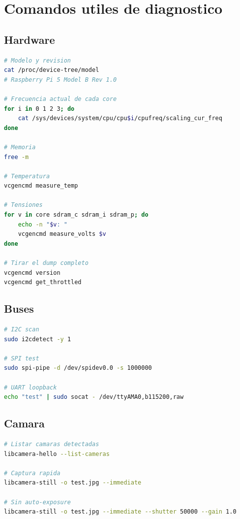 \documentclass[11pt,a4paper,oneside]{report}
\begin{document}
\chapter{Comandos utiles de diagnostico}

\section{Hardware}

\begin{lstlisting}[language=bash]
# Modelo y revision
cat /proc/device-tree/model
# Raspberry Pi 5 Model B Rev 1.0

# Frecuencia actual de cada core
for i in 0 1 2 3; do
    cat /sys/devices/system/cpu/cpu$i/cpufreq/scaling_cur_freq
done

# Memoria
free -m

# Temperatura
vcgencmd measure_temp

# Tensiones
for v in core sdram_c sdram_i sdram_p; do
    echo -n "$v: "
    vcgencmd measure_volts $v
done

# Tirar el dump completo
vcgencmd version
vcgencmd get_throttled
\end{lstlisting}

\section{Buses}

\begin{lstlisting}[language=bash]
# I2C scan
sudo i2cdetect -y 1

# SPI test
sudo spi-pipe -d /dev/spidev0.0 -s 1000000

# UART loopback
echo "test" | sudo socat - /dev/ttyAMA0,b115200,raw
\end{lstlisting}

\section{Camara}

\begin{lstlisting}[language=bash]
# Listar camaras detectadas
libcamera-hello --list-cameras

# Captura rapida
libcamera-still -o test.jpg --immediate

# Sin auto-exposure
libcamera-still -o test.jpg --immediate --shutter 50000 --gain 1.0
\end{lstlisting}
\end{document}
